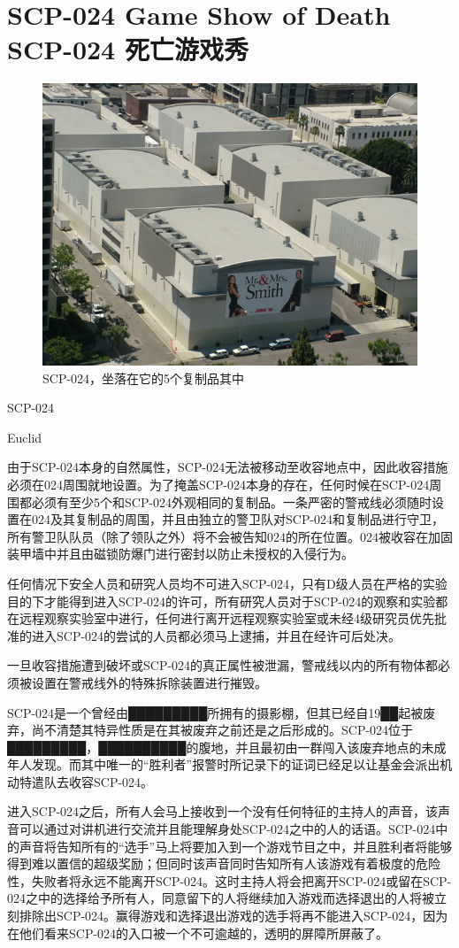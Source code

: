 \chapter[SCP-024 死亡游戏秀]{
    SCP-024 Game Show of Death\\
    SCP-024 死亡游戏秀
}

\label{chap:SCP-024}

\begin{figure}[H]
    \centering
    \includegraphics[width=0.5\linewidth]{images/SCP.024.jpg}
    \caption*{SCP-024，坐落在它的5个复制品其中}
\end{figure}

SCP-024

Euclid

由于SCP-024本身的自然属性，SCP-024无法被移动至收容地点中，因此收容措施必须在024周围就地设置。为了掩盖SCP-024本身的存在，任何时候在SCP-024周围都必须有至少5个和SCP-024外观相同的复制品。一条严密的警戒线必须随时设置在024及其复制品的周围，并且由独立的警卫队对SCP-024和复制品进行守卫，所有警卫队队员（除了领队之外）将不会被告知024的所在位置。024被收容在加固装甲墙中并且由磁锁防爆门进行密封以防止未授权的入侵行为。

任何情况下安全人员和研究人员均不可进入SCP-024，只有D级人员在严格的实验目的下才能得到进入SCP-024的许可，所有研究人员对于SCP-024的观察和实验都在远程观察实验室中进行，任何进行离开远程观察实验室或未经4级研究员优先批准的进入SCP-024的尝试的人员都必须马上逮捕，并且在经许可后处决。

一旦收容措施遭到破坏或SCP-024的真正属性被泄漏，警戒线以内的所有物体都必须被设置在警戒线外的特殊拆除装置进行摧毁。

SCP-024是一个曾经由█████████所拥有的摄影棚，但其已经自19██起被废弃，尚不清楚其特异性质是在其被废弃之前还是之后形成的。SCP-024位于█████████，██████████的腹地，并且最初由一群闯入该废弃地点的未成年人发现。而其中唯一的“胜利者”报警时所记录下的证词已经足以让基金会派出机动特遣队去收容SCP-024。

进入SCP-024之后，所有人会马上接收到一个没有任何特征的主持人的声音，该声音可以通过对讲机进行交流并且能理解身处SCP-024之中的人的话语。SCP-024中的声音将告知所有的“选手”马上将要加入到一个游戏节目之中，并且胜利者将能够得到难以置信的超级奖励；但同时该声音同时告知所有人该游戏有着极度的危险性，失败者将永远不能离开SCP-024。这时主持人将会把离开SCP-024或留在SCP-024之中的选择给予所有人，同意留下的人将继续加入游戏而选择退出的人将被立刻排除出SCP-024。赢得游戏和选择退出游戏的选手将再不能进入SCP-024，因为在他们看来SCP-024的入口被一个不可逾越的，透明的屏障所屏蔽了。

